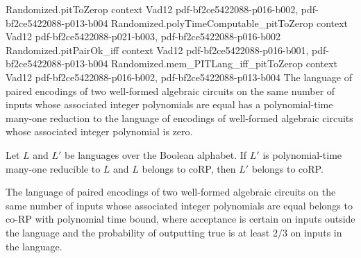 \begin{theorem}
\proofstep
  {Randomized.pitToZerop}
  {context}
  {Vad12}
  {pdf-bf2ce5422088-p016-b002,
    pdf-bf2ce5422088-p013-b004}
\proofstep
  {Randomized.polyTimeComputable_pitToZerop}
  {context}
  {Vad12}
  {pdf-bf2ce5422088-p021-b003,
    pdf-bf2ce5422088-p016-b002}
\proofstep
  {Randomized.pitPairOk_iff}
  {context}
  {Vad12}
  {pdf-bf2ce5422088-p016-b001,
    pdf-bf2ce5422088-p013-b004}
\proofstep
  {Randomized.mem_PITLang_iff_pitToZerop}
  {context}
  {Vad12}
  {pdf-bf2ce5422088-p016-b002,
    pdf-bf2ce5422088-p013-b004}
The language of paired encodings of two well-formed algebraic circuits on the same
number of inputs whose associated integer polynomials are equal has a polynomial-time
many-one reduction to the language of encodings of well-formed algebraic circuits whose
associated integer polynomial is zero.
\end{theorem}

\begin{theorem}
\label{Randomized.coRP_PTM_of_polyTimeReducible}
\leanok
{}
Let $L$ and $L'$ be languages over the Boolean alphabet. If $L'$ is polynomial-time
many-one reducible to $L$ and $L$ belongs to coRP, then $L'$ belongs to coRP.
\end{theorem}

\begin{theorem}
\label{Randomized.PITLang_mem_coRP_PTM_of_reduction}
\leanok
{}
The language of paired encodings of two well-formed algebraic circuits on the same
number of inputs whose associated integer polynomials are equal belongs to co-RP with
polynomial time bound, where acceptance is certain on inputs outside the language and
the probability of outputting true is at least $2/3$ on inputs in the language.
\end{theorem}
